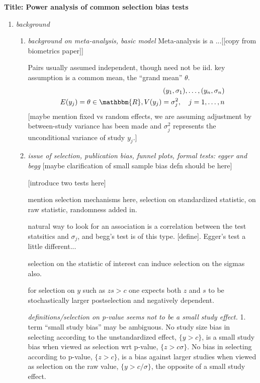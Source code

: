 \documentclass{article}
\newcommand{\E}{E}
\begin{document}
\textbf{Title: Power analysis of common selection bias tests}

\begin{enumerate}

\item \emph{background}
  \begin{enumerate}

  \item \emph{background on meta-analysis, basic model}
    Meta-analysis is a ...[[copy from biometrics paper]]

    Pairs usually assumed independent, though need not be iid. key
    assumption is a common mean, the ``grand mean'' $\theta$. 
    \begin{align}
      (y_1,\sigma_1),\ldots,(y_n,\sigma_n)\\
      \E(y_j)=\theta\in\mathbbm{R}, V(y_j)=\sigma_j^2,\hspace{10px}j=1,\ldots,n
    \end{align}
    [maybe mention fixed vs random effects, we are assuming adjustment
    by between-study variance has been made and $\sigma_j^2$
    represents the unconditional variance of study $y_j$.]

  \item\emph{issue of selection, publication bias, funnel plots, formal tests: egger and begg} [maybe clarification of small sample bias defn should be here]

    [introduce two tests here]

    mention selection mechanisms here, selection on standardized statistic, on raw statistic, randomness added in.

    natural way to look for an association is a correlation between the test statsitics and $\sigma_j$, and begg's test is of this type. [define]. Egger's test a little different...

    selection on the statistic of interest can induce selection on the sigmas also.

    for selection on $y$ such as $zs>c$ one expects both $z$ and $s$ to be stochastically larger postselection and negatively dependent.

    \emph{definitions/selection on p-value seems not to be a small study effect.}
  1. term ``small study bias'' may be ambiguous. No study size bias in selecting according to the unstandardized effect, $\{y>c\}$, is a small study bias when viewed as selection wrt p-value, $\{z>c\sigma\}$. No bias in selecting according to p-value, $\{z>c\}$, is a bias against larger studies when viewed as selection on the raw value, $\{y>c/\sigma\}$, the opposite of a small study effect.


\end{enumerate}
\end{enumerate}
\end{document}
